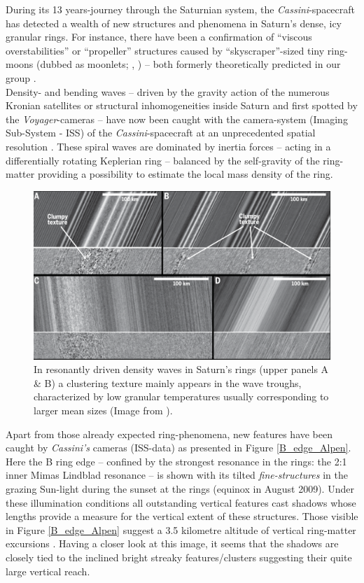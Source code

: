 \documentclass[11pt, notitlepage]{article} %
\begin{document}
During its 13 years-journey through the Saturnian system, the \emph{Cassini}-spacecraft has detected a wealth of new
structures and phenomena in Saturn's dense, icy granular rings. For instance, there have been a confirmation
of  ``viscous overstabilities'' \citep{thomson2007} or ``propeller'' structures caused by ``skyscraper''-sized tiny
ring-moons (dubbed as moonlets; \citeauthor{tiscareno2006}, \citeyear{tiscareno2006}) -- both formerly theoretically predicted
in our group \citep{schmidt2001,spahn2000b}.\\
Density- and bending waves -- driven by the gravity action of the numerous Kronian satellites or structural inhomogeneities 
inside Saturn and first spotted by the \emph{Voyager}-cameras -- have now been caught with the camera-system (Imaging Sub-System -
ISS) of the \emph{Cassini}-spacecraft  at an unprecedented spatial resolution \citep{French2016,Tiscareno2018}. These spiral waves are 
dominated by inertia forces -- acting in a differentially rotating  Keplerian ring --  balanced by the self-gravity of the ring-matter providing a 
possibility to estimate the local mass density of the ring.
\begin{figure}[ht]
	\centerline{
	\includegraphics[width=.7\textwidth]{Figures/Strawing.png}
	}
	\caption{\small
In resonantly driven density waves in Saturn's rings (upper panels A \& B) a clustering texture mainly appears in the wave troughs, 
characterized by low granular temperatures usually corresponding to larger mean sizes \citep{goldhirsch1993,esposito2012}  
(Image from \citet{Tiscareno2019}).
}
\label{WavesStraw}
\end{figure}
Apart from those already expected ring-phenomena, new features have been caught by \emph{Cassini's} cameras (ISS-data) as 
presented in Figure \ref{B_edge_Alpen}. Here the B ring edge --  confined by the strongest 
resonance in the rings: the 2:1 inner Mimas Lindblad resonance -- is shown with its tilted \emph{fine-structures} 
in the grazing Sun-light during the sunset at the rings (equinox in August 2009). Under these illumination conditions all outstanding 
vertical features cast shadows whose lengths provide a measure for the vertical extent of these structures. Those visible in 
Figure \ref{B_edge_Alpen} suggest a 3.5 kilometre  altitude of vertical ring-matter excursions \citep{spitale2010}. Having a closer 
look at this image, it seems that the shadows are closely tied to the inclined bright streaky features/clusters suggesting their quite large 
vertical reach.
\end{document}
